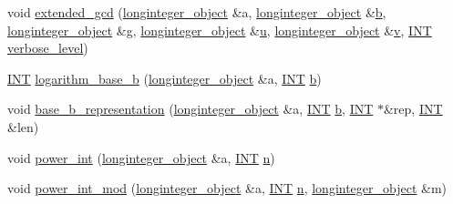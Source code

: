 \begin{DoxyCompactItemize}
\item 
void \mbox{\hyperlink{classlonginteger__domain_ae208917d7c9de815f6579779f0ea6f7d}{extended\+\_\+gcd}} (\mbox{\hyperlink{classlonginteger__object}{longinteger\+\_\+object}} \&a, \mbox{\hyperlink{classlonginteger__object}{longinteger\+\_\+object}} \&\mbox{\hyperlink{alphabet2_8_c_a148e3876077787926724625411d6e7a9}{b}}, \mbox{\hyperlink{classlonginteger__object}{longinteger\+\_\+object}} \&g, \mbox{\hyperlink{classlonginteger__object}{longinteger\+\_\+object}} \&\mbox{\hyperlink{alphabet2_8_c_a5874b4c2ec2e28321eea4e4871d08222}{u}}, \mbox{\hyperlink{classlonginteger__object}{longinteger\+\_\+object}} \&\mbox{\hyperlink{simeon_8_c_aeb3f3030944801b163bc3b829a7f6710}{v}}, \mbox{\hyperlink{galois_8h_a09fddde158a3a20bd2dcadb609de11dc}{I\+NT}} \mbox{\hyperlink{simeon_8_c_a818073fbcc2f439e7c56952f67386122}{verbose\+\_\+level}})
\item 
\mbox{\hyperlink{galois_8h_a09fddde158a3a20bd2dcadb609de11dc}{I\+NT}} \mbox{\hyperlink{classlonginteger__domain_a48ced88854ffc8207e85527bf01560ee}{logarithm\+\_\+base\+\_\+b}} (\mbox{\hyperlink{classlonginteger__object}{longinteger\+\_\+object}} \&a, \mbox{\hyperlink{galois_8h_a09fddde158a3a20bd2dcadb609de11dc}{I\+NT}} \mbox{\hyperlink{alphabet2_8_c_a148e3876077787926724625411d6e7a9}{b}})
\item 
void \mbox{\hyperlink{classlonginteger__domain_abe671698af1fc0150d7adb18975788fc}{base\+\_\+b\+\_\+representation}} (\mbox{\hyperlink{classlonginteger__object}{longinteger\+\_\+object}} \&a, \mbox{\hyperlink{galois_8h_a09fddde158a3a20bd2dcadb609de11dc}{I\+NT}} \mbox{\hyperlink{alphabet2_8_c_a148e3876077787926724625411d6e7a9}{b}}, \mbox{\hyperlink{galois_8h_a09fddde158a3a20bd2dcadb609de11dc}{I\+NT}} $\ast$\&rep, \mbox{\hyperlink{galois_8h_a09fddde158a3a20bd2dcadb609de11dc}{I\+NT}} \&len)
\item 
void \mbox{\hyperlink{classlonginteger__domain_adcc45b3b48746fa78c20881cd2553ab6}{power\+\_\+int}} (\mbox{\hyperlink{classlonginteger__object}{longinteger\+\_\+object}} \&a, \mbox{\hyperlink{galois_8h_a09fddde158a3a20bd2dcadb609de11dc}{I\+NT}} \mbox{\hyperlink{simeon_8_c_a7f2cd26777ce0ff3fdaf8d02aacbddfb}{n}})
\item 
void \mbox{\hyperlink{classlonginteger__domain_afc796e4ed416f1fe549a1f8379933395}{power\+\_\+int\+\_\+mod}} (\mbox{\hyperlink{classlonginteger__object}{longinteger\+\_\+object}} \&a, \mbox{\hyperlink{galois_8h_a09fddde158a3a20bd2dcadb609de11dc}{I\+NT}} \mbox{\hyperlink{simeon_8_c_a7f2cd26777ce0ff3fdaf8d02aacbddfb}{n}}, \mbox{\hyperlink{classlonginteger__object}{longinteger\+\_\+object}} \&m)

\end{DoxyCompactItemize}
